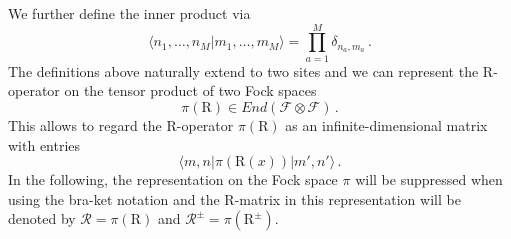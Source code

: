 \documentclass[11pt]{article}
\numberwithin{equation}{section}
\newcommand{\eR}{\mathcal{R}}
\newcommand{\abrOSCR}{\mathrm{R}}
\begin{document}
We further define the inner product via
\begin{equation}
 \langle n_1,\ldots,n_M|m_1,\ldots,m_M\rangle =\prod_{a=1}^M\delta_{n_a,m_a}\,.
\end{equation}
The definitions above naturally extend to two sites and we can represent the R-operator on the tensor product of two Fock spaces
\begin{equation}
 \pi(\abrOSCR)\in End(\mathcal{F}\otimes\mathcal{F})\,.
\end{equation}
This allows to regard the R-operator $\pi(\abrOSCR)$ as an infinite-dimensional matrix with entries
\begin{equation}
 \langle m,n|  \pi(\abrOSCR(x)) |m',n'\rangle\,.
\end{equation}
In the following, the representation on the Fock space $\pi$ will be suppressed when using the bra-ket notation and the R-matrix in this representation will be denoted by $\eR= \pi(\abrOSCR)$ and $\eR^\pm= \pi(\abrOSCR^\pm)$.
\end{document}
